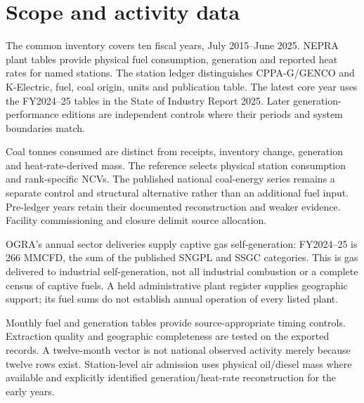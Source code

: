 \section{Scope and activity data}
\label{sec:data}
The common inventory covers ten fiscal years, July 2015--June 2025. NEPRA plant tables provide physical fuel consumption, generation and reported heat rates for named stations. The station ledger distinguishes CPPA-G/GENCO and K-Electric, fuel, coal origin, units and publication table. The latest core year uses the FY2024--25 tables in the State of Industry Report 2025. Later generation-performance editions are independent controls where their periods and system boundaries match.

Coal tonnes consumed are distinct from receipts, inventory change, generation and heat-rate-derived mass. The reference selects physical station consumption and rank-specific NCVs. The published national coal-energy series remains a separate control and structural alternative rather than an additional fuel input. Pre-ledger years retain their documented reconstruction and weaker evidence. Facility commissioning and closure delimit source allocation.

OGRA's annual sector deliveries supply captive gas self-generation: FY2024--25 is 266 MMCFD, the sum of the published SNGPL and SSGC categories. This is gas delivered to industrial self-generation, not all industrial combustion or a complete census of captive fuels. A held administrative plant register supplies geographic support; its fuel sums do not establish annual operation of every listed plant.

Monthly fuel and generation tables provide source-appropriate timing controls. Extraction quality and geographic completeness are tested on the exported records. A twelve-month vector is not national observed activity merely because twelve rows exist. Station-level air admission uses physical oil/diesel mass where available and explicitly identified generation/heat-rate reconstruction for the early years.
